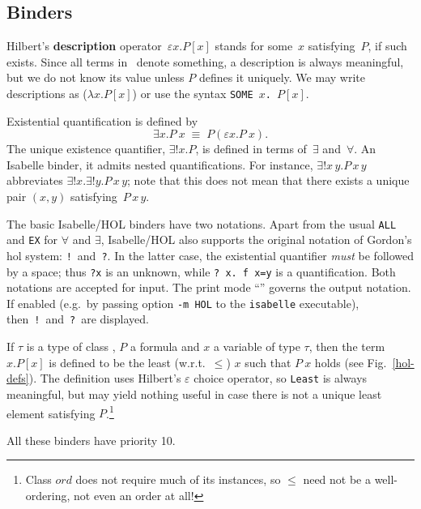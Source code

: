 \subsection{Binders}

Hilbert's {\bf description} operator~$\varepsilon x. P[x]$ stands for
some~$x$ satisfying~$P$, if such exists.  Since all terms in \HOL\ 
denote something, a description is always meaningful, but we do not
know its value unless $P$ defines it uniquely.  We may write
descriptions as ($\lambda x. P[x]$) or use the syntax
\hbox{\tt SOME~$x$.~$P[x]$}.

Existential quantification is defined by
\[ \exists x. P~x \;\equiv\; P(\varepsilon x. P~x). \]
The unique existence quantifier, $\exists!x. P$, is defined in terms
of~$\exists$ and~$\forall$.  An Isabelle binder, it admits nested
quantifications.  For instance, $\exists!x\,y. P\,x\,y$ abbreviates
$\exists!x. \exists!y. P\,x\,y$; note that this does not mean that there
exists a unique pair $(x,y)$ satisfying~$P\,x\,y$.

\medskip

 The
basic Isabelle/HOL binders have two notations.  Apart from the usual
\texttt{ALL} and \texttt{EX} for $\forall$ and $\exists$, Isabelle/HOL also
supports the original notation of Gordon's {\sc hol} system: \texttt{!}\ 
and~\texttt{?}.  In the latter case, the existential quantifier \emph{must} be
followed by a space; thus {\tt?x} is an unknown, while \verb'? x. f x=y' is a
quantification.  Both notations are accepted for input.  The print mode
``\ttindexbold{HOL}'' governs the output notation.  If enabled (e.g.\ by
passing option \texttt{-m HOL} to the \texttt{isabelle} executable),
then~{\tt!}\ and~{\tt?}\ are displayed.

\medskip

If $\tau$ is a type of class , $P$ a formula and $x$ a
variable of type $\tau$, then the term ~$x. P[x]$ is defined
to be the least (w.r.t.\ $\leq$) $x$ such that $P~x$ holds (see
Fig.~\ref{hol-defs}).  The definition uses Hilbert's $\varepsilon$
choice operator, so \texttt{Least} is always meaningful, but may yield
nothing useful in case there is not a unique least element satisfying
$P$.\footnote{Class $ord$ does not require much of its instances, so
  $\leq$ need not be a well-ordering, not even an order at all!}

\medskip All these binders have priority 10.

